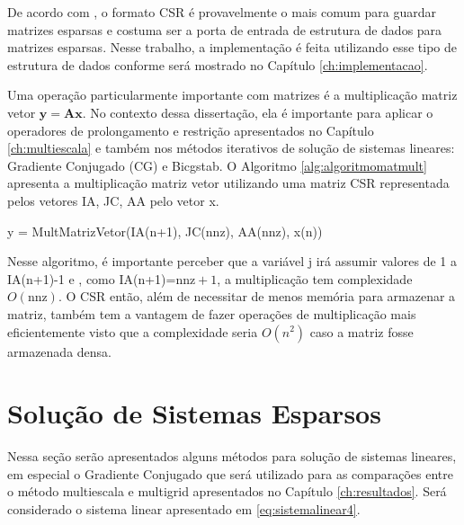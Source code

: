 De acordo com \citet{solverlinear}, o formato CSR é provavelmente o mais comum para guardar matrizes esparsas e costuma ser a porta de entrada de estrutura de dados para matrizes esparsas. Nesse trabalho, a implementação é feita utilizando esse tipo de estrutura de dados conforme será mostrado no Capítulo \ref{ch:implementacao}.

Uma operação particularmente importante com matrizes é a multiplicação matriz vetor $\mathbf{y} = \mathbf{A}\mathbf{x}$. No contexto dessa dissertação, ela é importante para aplicar o operadores de prolongamento e restrição apresentados no Capítulo \ref{ch:multiescala} e também nos métodos iterativos de solução de sistemas lineares: Gradiente Conjugado (CG) e Bicgstab. O Algoritmo \ref{alg:algoritmomatmult} apresenta a multiplicação matriz vetor utilizando uma matriz CSR representada pelos vetores IA, JC, AA pelo vetor x.


\vspace{1cm}
\begin{algorithm}[H]
\caption{y = MultMatrizVetor(IA(n+1), JC(nnz), AA(nnz), x(n))}
\label{alg:algoritmomatmult}

\end{algorithm}
\vspace{1cm}


Nesse algoritmo, é importante perceber que a variável j irá assumir valores de 1 a IA(n+1)-1 e , como IA(n+1)=$\text{nnz} + 1$, a multiplicação tem complexidade $O(\text{nnz})$. O CSR então, além de necessitar de menos memória para armazenar a matriz, também tem a vantagem de fazer operações de multiplicação mais eficientemente visto que a complexidade seria $O(n^2)$ caso a matriz fosse armazenada densa.


\section{Solução de Sistemas Esparsos} \label{sec:cg}

Nessa seção serão apresentados alguns métodos para solução de sistemas lineares, em especial o Gradiente Conjugado que será utilizado para as comparações entre o método multiescala e multigrid apresentados no Capítulo \ref{ch:resultados}. Será considerado o sistema linear apresentado em \eqref{eq:sistemalinear4}.

